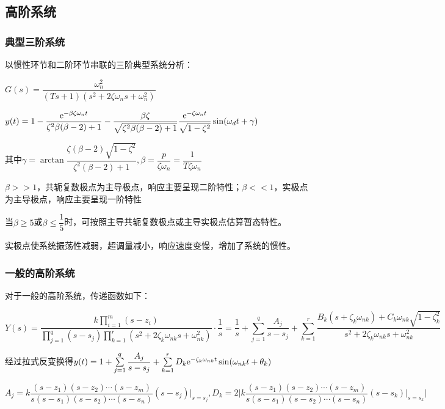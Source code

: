 \documentclass[11pt,a4paper]{ctexart}
\begin{document}
    \subsection{高阶系统}
        \subsubsection{典型三阶系统}
            以惯性环节和二阶环节串联的三阶典型系统分析：
        
            $G(s)=\dfrac{\omega_n^2}{(Ts+1)(s^2+2\zeta\omega_ns+\omega_n^2)}$

            $y(t)=1-\dfrac{{\rm e}^{-\beta\zeta\omega_nt}}{\zeta^2\beta(\beta-2)+1}-\dfrac{\beta\zeta}{\sqrt{\zeta^2\beta(\beta-2)+1}}
            \dfrac{{\rm e}^{-\zeta\omega_nt}}{\sqrt{1-\zeta^2}}\sin(\omega_dt+\gamma)$
            
            其中$\gamma=\arctan\dfrac{\zeta(\beta-2)\sqrt{1-\zeta^2}}{\zeta^2(\beta-2)+1},\beta=\dfrac{p}{\zeta\omega_n}=\dfrac{1}{T\zeta\omega_n}$

            $\beta>>1$，共轭复数极点为主导极点，响应主要呈现二阶特性；$\beta<<1$，实极点为主导极点，响应主要呈现一阶特性

            当$\beta\ge5$或$\beta\le\dfrac15$时，可按照主导共轭复数极点或主导实极点估算暂态特性。

            实极点使系统振荡性减弱，超调量减小，响应速度变慢，增加了系统的惯性。
        \subsubsection{一般的高阶系统}
            对于一般的高阶系统，传递函数如下：

            \[
            Y(s)=\dfrac{k\prod\limits_{i=1}^m(s-z_i)}{\prod\limits_{j=1}^q(s-s_j)\prod\limits_{k=1}^{r}(s^2+2\zeta_k\omega_{nk}s+\omega_{nk}^2)}\cdot\dfrac1s
            =\dfrac1s+\sum\limits_{j=1}^{q}\dfrac{A_j}{s-s_j}+\sum\limits_{k=1}^{r}\dfrac{B_k(s+\zeta_k\omega_{nk})+C_k\omega_{nk}\sqrt{1-\zeta_k^2}}{s^2+2\zeta_k\omega_{nk}s+\omega_{nk}^2}
            \]

            经过拉式反变换得$y(t)=1+\sum\limits_{j=1}^{q}\dfrac{A_j}{s-s_j}+\sum\limits_{k=1}^{r}D_k{\rm e}^{-\zeta_k\omega_{nk}t}\sin(\omega_{nk}t+\theta_k)$
            
            $A_j=k\dfrac{(s-z_1)(s-z_2)\cdots(s-z_m)}{s(s-s_1)(s-s_2)\cdots(s-s_n)}(s-s_j)\big|_{s=s_j},
            D_k=2\bigg|k\dfrac{(s-z_1)(s-z_2)\cdots(s-z_m)}{s(s-s_1)(s-s_2)\cdots(s-s_n)}(s-s_k)\big|_{s=s_k}\bigg|$
            
\end{document}
